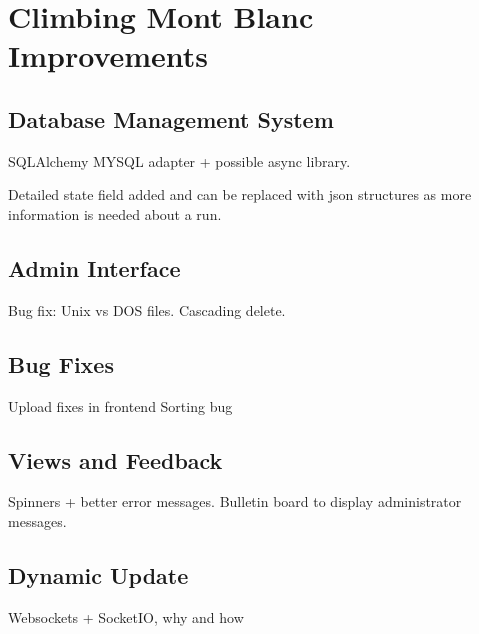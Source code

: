 \chapter{Climbing Mont Blanc Improvements}

\section{Database Management System}
SQLAlchemy MYSQL adapter + possible async library.

Detailed state field added and can be replaced with json structures as more information is needed about a run.

\section{Admin Interface}
Bug fix: Unix vs DOS files.
Cascading delete.

\section{Bug Fixes}
Upload fixes in frontend
Sorting bug

\section{Views and Feedback}
Spinners + better error messages. Bulletin board to display administrator messages.

\section{Dynamic Update}
Websockets + SocketIO, why and how
